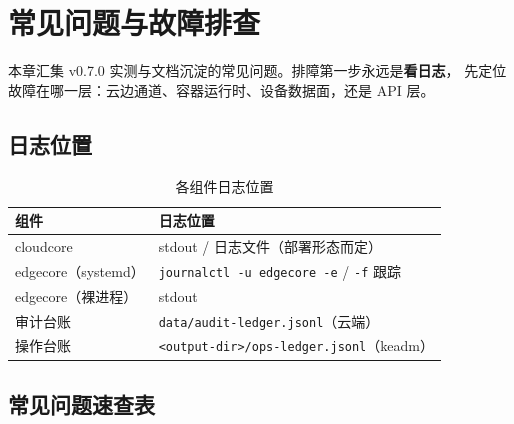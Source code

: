 \chapter{常见问题与故障排查}
\label{ch:9}

本章汇集 v0.7.0 实测与文档沉淀的常见问题。排障第一步永远是\textbf{看日志}，
先定位故障在哪一层：云边通道、容器运行时、设备数据面，还是 API 层。

\section{日志位置}

\begin{table}[htbp]
\centering
\caption{各组件日志位置}
\label{tab:9-logs}
\begin{tabularx}{\textwidth}{l X}
\toprule
\textbf{组件} & \textbf{日志位置} \\
\midrule
cloudcore & stdout / 日志文件（部署形态而定） \\
edgecore（systemd） & \texttt{journalctl -u edgecore -e} / \texttt{-f} 跟踪 \\
edgecore（裸进程） & stdout \\
审计台账 & \texttt{data/audit-ledger.jsonl}（云端） \\
操作台账 & \texttt{<output-dir>/ops-ledger.jsonl}（keadm） \\
\bottomrule
\end{tabularx}
\end{table}

\section{常见问题速查表}

